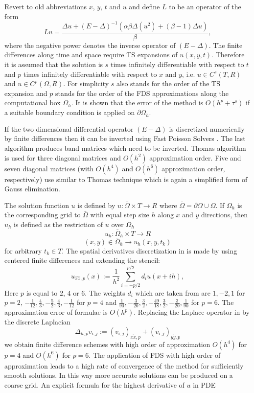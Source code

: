 \documentclass[11pt,a4paper,twoside]{article}
\begin{document}
Revert to old abbreviations $x$, $y$, $t$ and $u$ and define $L$ to be an operator of the form
\begin{equation}\label{operator}
Lu = \frac{\Delta u + (E-\Delta)^{-1} ( \alpha \beta \Delta( u^2) + (\beta -1)\Delta u)}{\beta},
\end{equation}
where the negative power denotes the inverse operator of $(E-\Delta)$. The finite differences along time and space require TS expansions of $u(x,y,t)$. Therefore it is assumed that the solution is $s$ times infinitely differentiable with respect to $t$ and $p$ times infinitely differentiable with respect to $x$ and $y$, i.e. $u \in C^s(T, R)$ and $u \in C^p(\Omega, R)$. For simplicity $s$ also stands for the order of the TS expansion and $p$ stands for the order of the FDS approximations along the computational box $\Omega_h$. It is shown that the error of the method is $O(h^p + \tau^s)$ if a suitable boundary condition is applied on $\partial \Omega_h$.

If the two dimensional differential operator $(E-\Delta)$ is discretized numerically by finite differences then it can be inverted using Fast Poisson Solvers \cite{FPS}. The last algorithm produces band matrices which need to be inverted. Thomas algorithm is used for three diagonal matrices and $O(h^2)$ approximation order.  Five and seven diagonal matrices (with $O(h^4)$ and $O(h^6)$ approximation order, respectively) use similar to Thomas technique which is again a simplified form of Gauss elimination.

The solution function $u$ is defined by $u : \bar \Omega \times T \rightarrow  R$ where $\bar \Omega = \partial \Omega \cup \Omega$. If $\Omega_h$ is the corresponding grid to $\bar \Omega$ with equal step size $h$ along $x$ and $y$ directions, then $u_h$ is defined as the restriction of $u$ over $\Omega_h$
$$u_h : \bar \Omega_h \times T \rightarrow  R$$
$$ (x,y) \in \bar \Omega_h \rightarrow u_h(x,y, t_k)$$
for arbitrary $t_k \in T$. The spatial derivatives discretization in  is made by using centered finite differences and extending the stencil:
\begin{equation}\label{fd}
u_{\widehat{xx},p}(x) :=  \frac{1}{h^2} \sum\limits_{i=-p/2}^{p/2} d_i u(x+ih),
\end{equation}
 Here $p$ is equal to $2$, $4$ or $6$.  The weights $d_i$ which are taken from \cite{forn} are  
 $ 1,-2,1$ for $p=2$, $-\frac{1}{12}, \frac{4}{3}, -\frac{5}{2}, \frac{4}{3}, -\frac{1}{12}$ for $p=4$ and  $\frac{1}{90}, -\frac{3}{20}, \frac{3}{2}, -\frac{49}{18}, \frac{3}{2}, -\frac{3}{20}, \frac{1}{90}$ for $p=6$. The approximation error of  formulae  is $O(h^p)$. Replacing the Laplace operator in  by the discrete Laplacian 
$$ \Delta_{h,p} v_{i,j} := (v_{i,j})_{\widehat{xx},p} + (v_{i,j})_{\widehat{yy},p}$$ 
we obtain finite difference schemes with high order of approximation $O(h^4)$ for $p=4$ and  $O(h^6)$ for $p=6 $.  The application of FDS with high order of approximation leads to a high rate of convergence of the method for sufficiently smooth solutions. In this way more accurate solutions can be produced on a coarse grid. An explicit formula for the highest derivative of $u$ in PDE  
\end{document}

